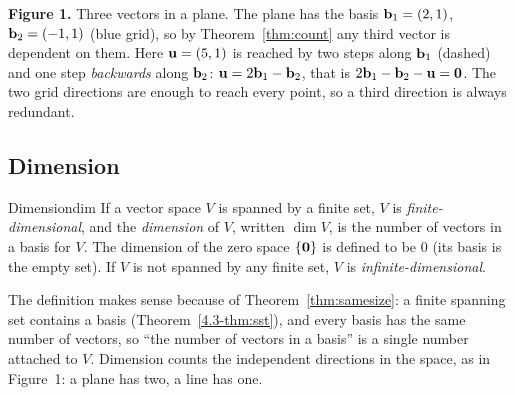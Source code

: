 \documentclass[11pt]{article}
\begin{document}
\begin{center}
\end{center}

\textbf{Figure 1.} Three vectors in a plane. The plane has the basis $\mathbf{b}_1=(2,1)$, $\mathbf{b}_2=(-1,1)$ (blue grid), so by Theorem~\ref{thm:count} any third vector is dependent on them. Here $\mathbf{u}=(5,1)$ is reached by two steps along $\mathbf{b}_1$ (dashed) and one step \emph{backwards} along $\mathbf{b}_2$: $\mathbf{u}=2\mathbf{b}_1-\mathbf{b}_2$, that is $2\mathbf{b}_1-\mathbf{b}_2-\mathbf{u}=\mathbf{0}$. The two grid directions are enough to reach every point, so a third direction is always redundant.

\subsection*{Dimension}

\begin{defn}{Dimension}{dim}
If a vector space $V$ is spanned by a finite set, $V$ is \emph{finite-dimensional}, and the \emph{dimension} of $V$, written $\dim V$, is the number of vectors in a basis for $V$. The dimension of the zero space $\{\mathbf{0}\}$ is defined to be $0$ (its basis is the empty set). If $V$ is not spanned by any finite set, $V$ is \emph{infinite-dimensional}.
\end{defn}

The definition makes sense because of Theorem~\ref{thm:samesize}: a finite spanning set contains a basis (Theorem~\ref{4.3-thm:sst}), and every basis has the same number of vectors, so ``the number of vectors in a basis'' is a single number attached to $V$. Dimension counts the independent directions in the space, as in Figure~1: a plane has two, a line has one.
\end{document}
